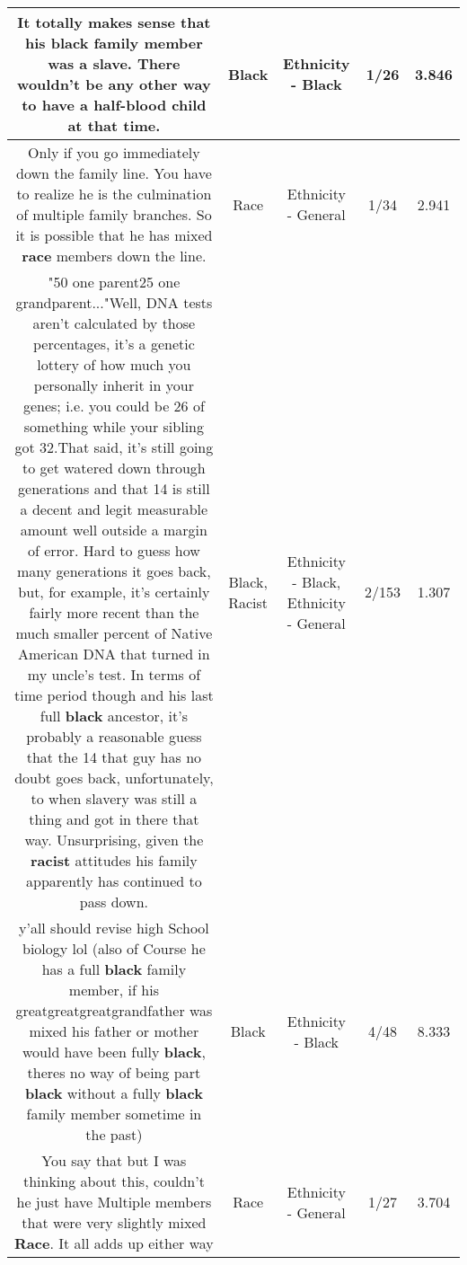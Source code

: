 \documentclass[11pt]{article}
\newlength\mylength
\begin{document}
\begin{center}
\begin{longtable}{|C{.65\mylength}|C{.30\mylength}|C{.12\mylength}|C{.12\mylength}|C{.12\mylength}|}
  \small It totally makes sense that his \textbf{black} family member was a slave. There wouldn't be any other way to  have a half-blood child at that time.\normalsize   & Black & Ethnicity - Black & 1/26 & 3.846 \\  \hline
  \small Only if you go immediately down the family line. You have to realize he is the culmination of multiple family branches. So it is possible that he has mixed \textbf{race} members down the line.\normalsize   & Race & Ethnicity - General & 1/34 & 2.941 \\  \hline
  \small "50 one parent25 one grandparent..."Well, DNA tests aren't calculated by those percentages, it's a genetic lottery of how much you personally inherit in your genes; i.e. you could be 26 of something while your sibling got 32.That said, it's still going to get watered down through generations and that 14 is still a decent and legit measurable amount well outside a margin of error. Hard to guess how many generations it goes back, but, for example, it's certainly fairly more recent than the much smaller percent of Native American DNA that turned in my uncle's test. In terms of time period though and his last full \textbf{black} ancestor, it's probably a reasonable guess that the 14 that guy has no doubt goes back, unfortunately, to when slavery was still a thing and got in there that way. Unsurprising, given the \textbf{racist} attitudes his family apparently has continued to pass down.\normalsize   & Black, Racist & Ethnicity - Black, Ethnicity - General & 2/153 & 1.307 \\  \hline
  \small y'all should revise high School biology lol (also of Course he has a full \textbf{black} family member, if his greatgreatgreatgrandfather was mixed his father or mother would have been fully \textbf{black}, theres no way of being part \textbf{black} without a fully \textbf{black} family member sometime in the past)\normalsize   & Black & Ethnicity - Black & 4/48 & 8.333 \\  \hline
  \small You say that but I was thinking about this, couldn't he just have Multiple members that were very slightly mixed \textbf{Race}. It all adds up either way\normalsize   & Race & Ethnicity - General & 1/27 & 3.704 \\  \hline

\end{longtable}
\end{center}
\end{document}
